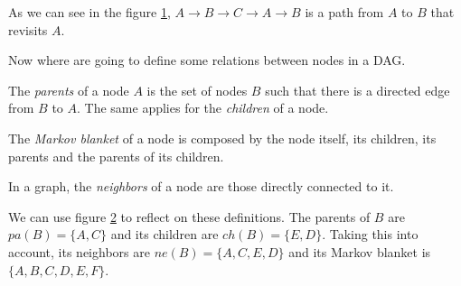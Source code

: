 \begin{figure}[h]
\centering
{}
\label{fig:not_dag}
\end{figure}

As we can see in the figure \ref{fig:not_dag}, \(A \to B \to C \to A \to B\) is a
path from \(A\) to \(B\) that revisits \(A\).

Now where are going to define some relations between nodes in a DAG.

\begin{definition}
The \emph{parents} of a node \(A\) is the set of nodes \(B\) such that there is a
directed edge from \(B\) to \(A\). The same applies for the \emph{children} of a node.

The \emph{Markov blanket} of a node is composed by the node itself, its children, its parents and the parents
of its children.
\end{definition}


\begin{figure}[h]
\centering
{}
\label{fig:relations}
\end{figure}

\begin{definition}
In a graph, the \emph{neighbors} of a node are those directly connected
to it.
\end{definition}

We can use figure \ref{fig:relations} to reflect on these definitions. The parents
of \(B\) are \(pa(B) = \{A,C\}\) and its children are \(ch(B) = \{E,D\}\). Taking this into account, its neighbors
are \(ne(B) = \{A,C,E,D\}\) and its Markov blanket is \(\{A,B,C,D,E,F\}\).
